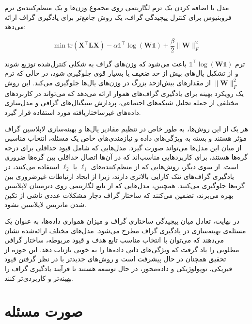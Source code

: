 \documentclass[12pt,onecolumn,a4paper]{article}
\begin{document}
     مدل 
     \cite{Kalofolias2016}
     با اضافه کردن یک ترم لگاریتمی روی مجموع وزن‌ها و یک منظم‌کننده‌ی نرم فروبنیوس برای کنترل پیچیدگی گراف، یک روش جامع‌تر برای یادگیری گراف ارائه می‌دهد:
     
     \[
     \min \text{tr} (\bm{X}^\top \bm{L} \bm{X}) - \alpha \mathds{1}^\top \log (\bm{W} \mathds{1}) + \frac{\beta}{2} \|\bm{W}\|_F^2
     \]
     
     ترم \( \mathds{1}^\top \log (\bm{W} \mathds{1}) \) باعث می‌شود که وزن‌های گراف به شکلی کنترل‌شده توزیع شوند و از تشکیل یال‌های بیش از حد ضعیف یا بسیار قوی جلوگیری شود، در حالی که ترم \( \|\bm{W}\|_F^2 \) از مقدارهای بیش‌ازحد بزرگ در وزن‌های یال‌ها جلوگیری می‌کند. این روش یک رویکرد بهینه برای یادگیری گراف‌های هموار ارائه می‌دهد که می‌تواند در کاربردهای مختلفی از جمله تحلیل شبکه‌های اجتماعی، پردازش سیگنال‌های گرافی و مدل‌سازی داده‌های غیرساختاریافته مورد استفاده قرار گیرد.
     
     هر یک از این روش‌ها، به طور خاص در تنظیم مقادیر یال‌ها و بهینه‌سازی لاپلاسین گراف مؤثر هستند و بسته به ویژگی‌های داده و نیازمندی‌های خاص یک مسئله، انتخاب مناسبی از میان این مدل‌ها می‌تواند صورت گیرد. مدل‌هایی که شامل قیود حداقلی برای درجه گره‌ها هستند، برای کاربردهایی مناسب‌اند که در آن‌ها اتصال حداقلی بین گره‌ها ضروری است. از سوی دیگر، روش‌هایی که از منظم‌کننده‌های \(\ell_1\) یا \(\ell_2\) استفاده می‌کنند، در یادگیری گراف‌های تنک کارایی بالاتری دارند، زیرا از ایجاد ارتباطات غیرضروری بین گره‌ها جلوگیری می‌کنند. همچنین، مدل‌هایی که از تابع لگاریتمی روی دترمینان لاپلاسین بهره می‌برند، تضمین می‌کنند که ساختار گراف دچار مشکلات عددی ناشی از تکین شدن ماتریس لاپلاسین نشود.
     
     در نهایت، تعادل میان پیچیدگی ساختاری گراف و میزان همواری داده‌ها، به عنوان یک مسئله‌ی بهینه‌سازی در یادگیری گراف مطرح می‌شود. مدل‌های مختلف ارائه‌شده نشان می‌دهند که می‌توان با انتخاب مناسب تابع هدف و قیود مربوطه، ساختار گرافی مطلوبی را یاد گرفت که ویژگی‌های ذاتی داده‌ها را به خوبی بازتاب دهد. این حوزه از تحقیق همچنان در حال پیشرفت است و روش‌های جدیدتر با در نظر گرفتن قیود فیزیکی، توپولوژیکی و داده‌محور، در حال توسعه هستند تا فرآیند یادگیری گراف را بهینه‌تر و کاربردی‌تر کنند.
     
     
     
     
     
     
     
      
    \section{صورت مسئله}
    
\end{document}
